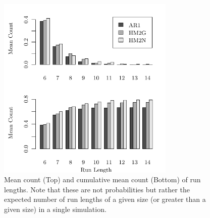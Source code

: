 \documentclass[wrr]{AGUTeX}
\begin{document}
\begin{figure}
\centering
\noindent\includegraphics[width=20pc]{plots/hmm-sim-figure6.pdf}
\caption{Mean count (Top) and cumulative mean count (Bottom) of run lengths.  Note that these are not probabilities but rather the expected number of run lengths of a given size (or greater than a given size) in a single simulation. }\label{fig:mean-count}
\end{figure}
\end{document}
